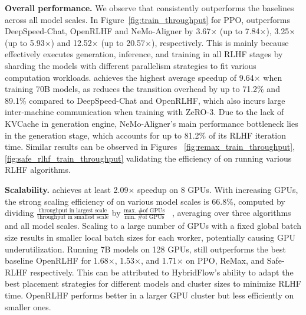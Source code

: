 \noindent \textbf{Overall performance.}
We observe that \sysname{} consistently outperforms the baselines across all model scales. In Figure~\ref{fig:train_throughput} for PPO, \sysname{} outperforms DeepSpeed-Chat, OpenRLHF and NeMo-Aligner by 3.67$\times$ (up to 7.84$\times$), 3.25$\times$ (up to 5.93$\times$) and 12.52$\times$ (up to 20.57$\times$), respectively. This is mainly because \sysname{} effectively executes generation, inference, and training in all RLHF stages by sharding the models with different parallelism strategies to fit various computation workloads. \sysname{} achieves the highest average speedup of 9.64$\times$ when training 70B models, 
as \sysname{} reduces the transition overhead by up to 71.2\% and 89.1\% compared to DeepSpeed-Chat and OpenRLHF, which also incurs large inter-machine communication when training with ZeRO-3.
Due to the lack of KVCache in generation engine, NeMo-Aligner's main performance bottleneck lies in the generation stage, which accounts for up to 81.2\% of its %
RLHF iteration time. %
Similar %
results can be observed in Figures ~\ref{fig:remax_train_throughput}, 
\ref{fig:safe_rlhf_train_throughput}
validating the efficiency of \sysname{} on running various RLHF algorithms.


\noindent \textbf{Scalability.} %
\sysname{} achieves at least 2.09$\times$ speedup %
on 8 GPUs. With increasing GPUs, the strong scaling efficiency of \sysname{} on various model scales is 66.8\%, computed by dividing $\frac{\mbox{throughput in largest scale}}{\mbox{throughput in smallest scale}}$ by $\frac{\mbox{max. \# of GPUs}}{\mbox{min. \# of GPUs}}$%
~\cite{amdahl1967strongscaling}, averaging over three algorithms and all model scales.
Scaling to a large number of GPUs with a fixed global batch size results in smaller local batch sizes for each worker, potentially causing GPU underutilization. Running 7B models on 128 GPUs, \sysname{} still outperforms the best baseline OpenRLHF for 1.68$\times$, 1.53$\times$, and 1.71$\times$ on PPO, ReMax, and Safe-RLHF respectively. This can be attributed to HybridFlow's ability to adapt the best placement strategies for different models and cluster sizes to minimize RLHF time. OpenRLHF performs better in a larger GPU cluster but less efficiently on smaller ones.















